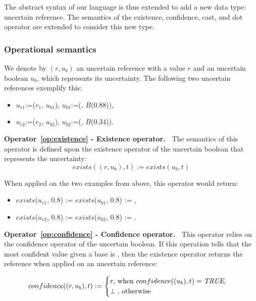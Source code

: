 The abstract syntax of our language is thus extended to add a new data type: uncertain reference.
The semantics of the existence, confidence, cast, and dot operator are extended to consider this new type.

\subsubsection{Operational semantics}
We denote by $(r, u_b)$ an uncertain reference with a value $r$ and an uncertain boolean $u_b$, which represents its uncertainty.
The following two uncertain references exemplify this:
\begin{itemize}
    \item $u_{r1}$:=($r_1$, $u_{b1}$), $u_{b1}$:=(\true{}, $B$(0.88)),
    \item $u_{r2}$:=($r_2$, $u_{b2}$), $u_{b2}$:=(\true{}, $B$(0.34)).
\end{itemize}

\bigskip

\noindent\textbf{Operator~\ref{op:existence} - Existence operator.~}
The semantics of this operator is defined upon the existence operator of the uncertain boolean that represents the uncertainty:
$$exists((r, u_b), t) := exists(u_b, t)$$

When applied on the two examples from above, this operator would return:
\begin{itemize}
    \item $exists$($u_{r1}$, 0.8) := $exists$($u_{b1}$, 0.8) := \true{},
    \item $exists$($u_{r2}$, 0.8) := $exists$($u_{b2}$, 0.8) := \false{}.
\end{itemize}

\noindent\textbf{Operator~\ref{op:confidence} - Confidence operator.~}
This operator relies on the confidence operator of the uncertain boolean.
If this operation tells that the most confident value given a base is \true{}, then the existence operator returns the reference when applied on an uncertain reference:
 
$$confidence((r,u_b), t) := \begin{cases}
                                                r \text{, when } confidence((u_b), t) = \textit{TRUE}{}, \\
                                                \perp \text{, otherwise}
                                            \end{cases}$$
                                           
